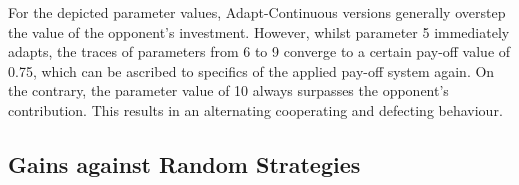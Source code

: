 \documentclass[11pt]{article}
\begin{document}
	\noindent
	For the depicted parameter values, Adapt-Continuous versions generally overstep the value of the opponent's investment.
	However, whilst parameter 5 immediately adapts, the traces of parameters from 6 to 9 converge to a certain pay-off value of 0.75, which can be ascribed to specifics of the applied pay-off system again.
	On the contrary, the parameter value of 10 always surpasses the opponent's contribution.
	This results in an alternating cooperating and defecting behaviour.
	

\subsection{Gains against Random Strategies}
	
\end{document}
